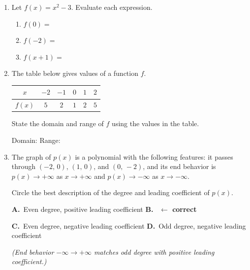 \documentclass[10pt]{article}
\begin{document}
\namedateperiod

\vspace{0.12in}

\begin{enumerate}[itemsep=14pt]

\item Let $f(x) = x^2 - 3$. Evaluate each expression.

      \medskip
      \begin{enumerate}[label=(\alph*), itemsep=6pt]
        \item $f(0) = $ 
        \item $f(-2) = $ 
        \item $f(x+1) = $ 
      \end{enumerate}

\item The table below gives values of a function $f$.

      \medskip
      \renewcommand{\arraystretch}{1.3}
      \begin{tabular}{|c|c|c|c|c|c|}
      \hline
      $x$    & $-2$ & $-1$ & $0$ & $1$ & $2$ \\
      \hline
      $f(x)$ & $5$  & $2$  & $1$ & $2$ & $5$ \\
      \hline
      \end{tabular}

      \medskip
      State the domain and range of $f$ using the values in the table.

      \vspace{0.08in}
      Domain:  \quad Range: 

\item The graph of $p(x)$ is a polynomial with the following features: it passes through
      $(-2,\,0)$, $(1,\,0)$, and $(0,\,-2)$, and its end behavior is
      $p(x) \to +\infty$ as $x \to +\infty$ and $p(x) \to -\infty$ as $x \to -\infty$.

      Circle the best description of the degree and leading coefficient of $p(x)$.

      \medskip
      \textbf{A.}\ Even degree, positive leading coefficient \qquad
      \textbf{B.}\  \textcolor{keyred}{\textbf{$\leftarrow$ correct}}

      \medskip
      \textbf{C.}\ Even degree, negative leading coefficient \qquad
      \textbf{D.}\ Odd degree, negative leading coefficient

      \smallskip
      \textit{(End behavior $-\infty \to +\infty$ matches odd degree with positive leading coefficient.)}

\end{enumerate}
\end{document}
